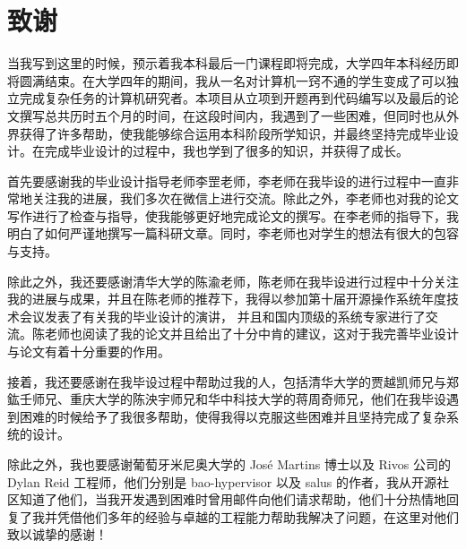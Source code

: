 \titleformat{\chapter}{\centering\xiaosan\hei}{\chaptername}{2em}{} %




\chapter*{致\quad 谢}

当我写到这里的时候，预示着我本科最后一门课程即将完成，大学四年本科经历即将圆满结束。在大学四年的期间，我从一名对计算机一窍不通的学生变成了可以独立完成复杂任务的计算机研究者。本项目从立项到开题再到代码编写以及最后的论文撰写总共历时五个月的时间，在这段时间内，我遇到了一些困难，但同时也从外界获得了许多帮助，使我能够综合运用本科阶段所学知识，并最终坚持完成毕业设计。在完成毕业设计的过程中，我也学到了很多的知识，并获得了成长。

首先要感谢我的毕业设计指导老师李罡老师，李老师在我毕设的进行过程中一直非常地关注我的进展，我们多次在微信上进行交流。除此之外，李老师也对我的论文写作进行了检查与指导，使我能够更好地完成论文的撰写。在李老师的指导下，我明白了如何严谨地撰写一篇科研文章。同时，李老师也对学生的想法有很大的包容与支持。

除此之外，我还要感谢清华大学的陈渝老师，陈老师在我毕设进行过程中十分关注我的进展与成果，并且在陈老师的推荐下，我得以参加第十届开源操作系统年度技术会议发表了有关我的毕业设计的演讲，
并且和国内顶级的系统专家进行了交流。陈老师也阅读了我的论文并且给出了十分中肯的建议，这对于我完善毕业设计与论文有着十分重要的作用。

接着，我还要感谢在我毕设过程中帮助过我的人，包括清华大学的贾越凯师兄与郑鈜壬师兄、重庆大学的陈泱宇师兄和华中科技大学的蒋周奇师兄，他们在我毕设遇到困难的时候给予了我很多帮助，使得我得以克服这些困难并且坚持完成了复杂系统的设计。

除此之外，我也要感谢葡萄牙米尼奥大学的 José Martins 博士以及 Rivos 公司的 Dylan Reid 工程师，他们分别是 bao-hypervisor 以及 salus 的作者，我从开源社区知道了他们，当我开发遇到困难时曾用邮件向他们请求帮助，他们十分热情地回复了我并凭借他们多年的经验与卓越的工程能力帮助我解决了问题，在这里对他们致以诚挚的感谢！

